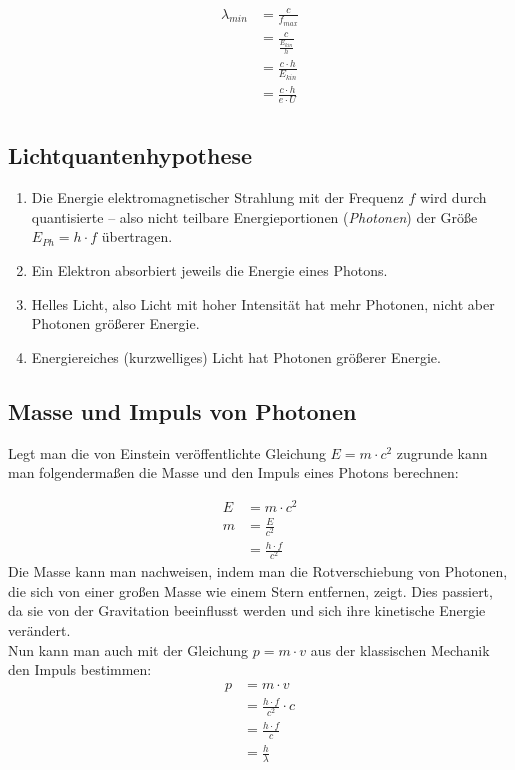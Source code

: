 \documentclass[a4paper]{article}
\begin{document}
			\begin{equation}
				\begin{aligned}
					\lambda_{min} &= \frac{c}{f_{max}}\\
					&= \frac{c}{\frac{E_{kin}}{h}}\\
					&= \frac{c\cdot h}{E_{kin}}\\
					&= \frac{c\cdot h}{e\cdot U}\\
				\end{aligned}
			\end{equation}
			
		\subsection{Lichtquantenhypothese}
		\begin{enumerate}
			\item Die Energie elektromagnetischer Strahlung mit der Frequenz $f$ wird durch quantisierte – also nicht teilbare Energieportionen (\textit{Photonen}) der Größe $E_{Ph} = h\cdot f$ übertragen.
			\item Ein Elektron absorbiert jeweils die Energie eines Photons.
			\item Helles Licht, also Licht mit hoher Intensität hat mehr Photonen, nicht aber Photonen größerer Energie.
			\item Energiereiches (kurzwelliges) Licht hat Photonen größerer Energie.
		\end{enumerate}				
			
		\subsection{Masse und Impuls von Photonen}
			Legt man die von Einstein veröffentlichte Gleichung $E=m\cdot c^2$ zugrunde kann man folgendermaßen die Masse und den Impuls eines Photons berechnen:
			
			\begin{equation}
				\begin{aligned}
					E&=m\cdot c^2\\
					m &= \frac{E}{c^2}\\
					&= \frac{h\cdot f}{c^2}
				\end{aligned}
			\end{equation}
			Die Masse kann man nachweisen, indem man die Rotverschiebung von Photonen, die sich von einer großen Masse wie einem Stern entfernen, zeigt. Dies passiert, da sie von der Gravitation beeinflusst werden und sich ihre kinetische Energie verändert.\\
			Nun kann man auch mit der Gleichung $p=m\cdot v$ aus der klassischen Mechanik den Impuls bestimmen:
			\begin{equation}
				\begin{aligned}
					p&=m\cdot v\\
					&=\frac{h\cdot f}{c^2}\cdot c\\
					&=\frac{h\cdot f}{c}\\
					&=\frac{h}{\lambda}\\
				\end{aligned}
			\end{equation}
			
\end{document}

